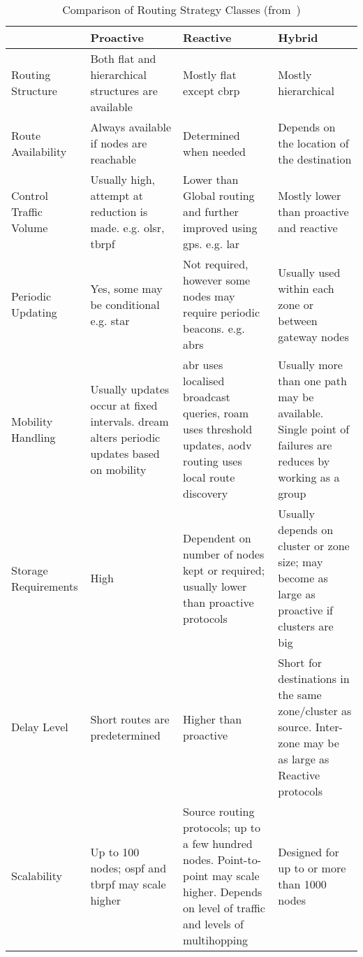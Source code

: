 \begin{table}[H]\centering
	\caption[Comparison of Routing Strategy Classes]{Comparison of Routing Strategy Classes (from~\citet{Abolhasan2004})}
	\label{tab:routing_categories}
	\begin{tabularx}{\textwidth}{p{2cm}|XXX}\toprule
		\diagbox[width=2cm, height=1.8cm]{Area}{Class} & Proactive & Reactive & Hybrid \\ \midrule
		Routing Structure & 
		Both flat and hierarchical structures are available &
		Mostly flat except \gls{cbrp} &
		Mostly hierarchical \\
		Route Availability &
		Always available if nodes are reachable &
		Determined when needed &
		Depends on the location of the destination \\
		Control Traffic Volume &
		Usually high, attempt at reduction is made. e.g. \gls{olsr}, \gls{tbrpf} &
		Lower than Global routing and further improved using \gls{gps}. e.g. \gls{lar} &
		Mostly lower than proactive and reactive \\
		Periodic Updating &
		Yes, some may be conditional e.g. \gls{star} &
		Not required, however some nodes may require periodic beacons. e.g. \glspl{abr} &
		Usually used within each zone or between gateway nodes \\
		Mobility Handling &
		Usually updates occur at fixed intervals. \gls{dream} alters periodic updates based on mobility &
		\gls{abr} uses localised broadcast queries, \gls{roam} uses threshold updates, \gls{aodv} routing uses local route discovery &
		Usually more than one path may be available. Single point of failures are reduces by working as a group\\
		Storage Requirements &
		High &
		Dependent on number of nodes kept or required; usually lower than proactive protocols &
		Usually depends on cluster or zone size; may become as large as proactive if clusters are big \\
		Delay Level &
		Short routes are predetermined &
		Higher than proactive &
		Short for destinations in the same zone/cluster as source. Inter-zone may be as large as Reactive protocols\\
		Scalability &
		Up to 100 nodes; \gls{ospf} and \gls{tbrpf} may scale higher &
		Source routing protocols; up to a few hundred nodes. Point-to-point may scale higher. Depends on level of traffic and levels of multihopping&
		Designed for up to or more than 1000 nodes \\
		\bottomrule
	\end{tabularx}
\end{table}


